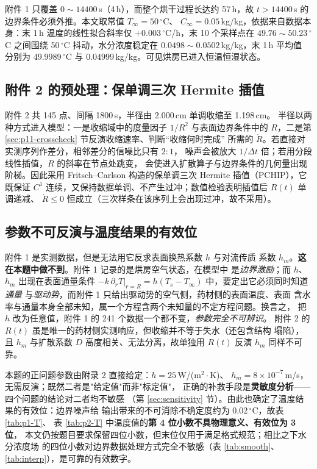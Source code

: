 \documentclass[12pt,a4paper,fontset=none]{ctexart}
\begin{document}
附件 1 只覆盖 $0\sim14400$\,s（4\,h），而整个烘干过程长达约 57\,h，故
$t>14400$\,s 的边界条件必须外推。本文取常值 $T_\infty=50\,^\circ$C、
$C_\infty=0.05$\,kg/kg，依据来自数据本身：末 1\,h 温度的线性拟合斜率仅
$+0.003\,^\circ$C/h，末 10 个采样点在 $49.76\sim50.23\,^\circ$C 之间围绕
50\,$^\circ$C 抖动，水分浓度稳定在 $0.0498\sim0.0502$\,kg/kg，末 1\,h 平均值
分别为 $49.9989\,^\circ$C 与 $0.04999$\,kg/kg。可见烘房已进入恒温恒湿状态。

\subsection{附件 2 的预处理：保单调三次 Hermite 插值}

附件 2 共 145 点、间隔 1800\,s，半径由 2.000\,cm 单调收缩至 1.198\,cm。
半径以两种方式进入模型：一是收缩域中的度量因子 $1/R^2$ 与表面边界条件中的
$R$，二是第 \ref{sec:p11-crosscheck} 节反演收缩速率、判断“收缩何时完成”
所需的 $\dot R$。若直接对实测序列作差分，相邻差分的信噪比只有 $2:1$，
噪声会被放大 $1/\Delta t$ 倍；若用分段线性插值，$R$ 的斜率在节点处跳变，
会使进入扩散算子与边界条件的几何量出现阶梯。因此采用 Fritsch--Carlson\cite{ref-fc}
构造的保单调三次 Hermite 插值（PCHIP），它既保证
$C^1$ 连续，又保持数据单调、不产生过冲；数值检验表明插值后 $R(t)$ 单调递减、
$\dot R\le0$ 恒成立（三次样条在该序列上会出现过冲，故不采用）。

\subsection{参数不可反演与温度结果的有效位}
\label{sec:identify}

附件 1 是实测数据，但是无法用它反求表面换热系数 $h$ 与对流传质
系数 $h_m$。\textbf{这在本题中做不到}。附件 1 记录的是烘房空气状态，在模型中
是\emph{边界激励}；而 $h$、$h_m$ 出现在表面通量条件
$-k\,\partial_rT|_{r=R}=h(T_s-T_\infty)$ 中，要定出它必须同时知道\emph{通量}
与\emph{驱动势}，而附件 1 只给出驱动势的空气侧，药材侧的表面温度、表面
含水率与通量本身全部未知，属一个方程含两个未知量的不定方程问题。换言之，
把 $h$ 改为任意值，附件 1 的 241 个数据一个都不变，\emph{参数完全不可辨识}。
附件 2 的 $R(t)$ 虽是唯一的药材侧实测响应，但收缩并不等于失水（还包含结构
塌陷），且 $h_m$ 与扩散系数 $D$ 高度相关、无法分离，故单独用 $R(t)$ 反演
$h_m$ 同样不可靠。

本题的正问题参数由附录 2 直接给定：$h=25$\,W/(m$^2\cdot$K)、
$h_m=8\times10^{-7}$\,m/s，无需反演；既然二者是"给定值"而非"标定值"，
正确的补救手段是\textbf{灵敏度分析}——四个问题的结论对二者均不敏感
（第 \ref{sec:sensitivity} 节）。由此也确定了温度结果的有效位：边界噪声给
输出带来的不可消除不确定度约为 $0.02\,^\circ$C，故表 \ref{tab:p1-T}、
表 \ref{tab:p2-T} 中温度值的\textbf{第 4 位小数不具物理意义、有效位为 3 位}，
本文仍按题目要求保留四位小数，但末位仅用于满足格式规范；相比之下水分浓度场
的四位小数对边界数据处理方式完全不敏感（表 \ref{tab:smooth}、
\ref{tab:interp}），是可靠的有效数字。
\end{document}
